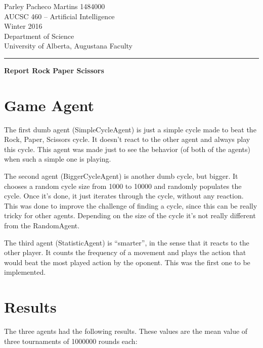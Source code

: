 \documentclass[12pt]{article}
\begin{document}
\noindent
Parley Pacheco Martins 1484000\\
AUCSC 460 -- Artificial Intelligence\\
Winter 2016\\
Department of Science\\
University of Alberta, Augustana Faculty

\vspace*{0.75\baselineskip}
\hrule
\vspace*{0.75\baselineskip}

\noindent
{\Large\bf Report Rock Paper Scissors }

\section{Game Agent}

The first dumb agent (SimpleCycleAgent) is just a simple cycle made to beat the Rock, Paper, Scissors cycle. It doesn't react to the other agent and always play this cycle. This agent was made just to see the behavior (of both of the agents) when such a simple one is playing.

The second agent (BiggerCycleAgent) is another dumb cycle, but bigger. It chooses a random cycle size from 1000 to 10000 and randomly populates the cycle.
Once it's done, it just iterates through the cycle, without any reaction. This was done to improve the challenge of finding a cycle, since this can be really tricky for other agents. Depending on the size of the cycle it's not really different from the RandomAgent.

The third agent (StatisticAgent) is ``smarter'', in the sense that it reacts to the other player. It counts the frequency of a movement and plays the action that would beat the most played action by the oponent. This was the first one to be implemented.



\section{Results}

The three agents had the following results. These values are the mean value of three tournaments of 1000000 rounds each:
\end{document}

